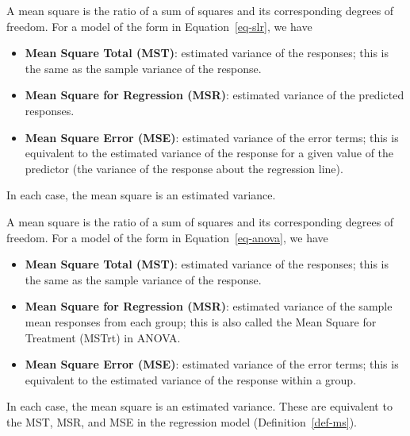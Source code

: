 \documentclass[
  letterpaper,
  DIV=11,
  numbers=noendperiod]{scrreprt}
\providecommand{\tightlist}{%
  \setlength{\itemsep}{0pt}\setlength{\parskip}{0pt}}\usepackage{longtable,booktabs,array}
\theoremstyle{plain}
\theoremstyle{definition}
\theoremstyle{definition}
\theoremstyle{remark}
\begin{document}
\begin{description}
\tightlist
\item[Mean Square (Definition~\ref{def-ms})]
A mean square is the ratio of a sum of squares and its corresponding
degrees of freedom. For a model of the form in Equation~\ref{eq-slr}, we
have
\end{description}

\begin{itemize}
\tightlist
\item
  \textbf{Mean Square Total (MST)}: estimated variance of the responses;
  this is the same as the sample variance of the response.
\item
  \textbf{Mean Square for Regression (MSR)}: estimated variance of the
  predicted responses.
\item
  \textbf{Mean Square Error (MSE)}: estimated variance of the error
  terms; this is equivalent to the estimated variance of the response
  for a given value of the predictor (the variance of the response about
  the regression line).
\end{itemize}

In each case, the mean square is an estimated variance.

\begin{description}
\tightlist
\item[Mean Square (in ANOVA) (Definition~\ref{def-ms-anova})]
A mean square is the ratio of a sum of squares and its corresponding
degrees of freedom. For a model of the form in Equation~\ref{eq-anova},
we have
\end{description}

\begin{itemize}
\tightlist
\item
  \textbf{Mean Square Total (MST)}: estimated variance of the responses;
  this is the same as the sample variance of the response.
\item
  \textbf{Mean Square for Regression (MSR)}: estimated variance of the
  sample mean responses from each group; this is also called the Mean
  Square for Treatment (MSTrt) in ANOVA.
\item
  \textbf{Mean Square Error (MSE)}: estimated variance of the error
  terms; this is equivalent to the estimated variance of the response
  within a group.
\end{itemize}

In each case, the mean square is an estimated variance. These are
equivalent to the MST, MSR, and MSE in the regression model
(Definition~\ref{def-ms}).
\end{document}
